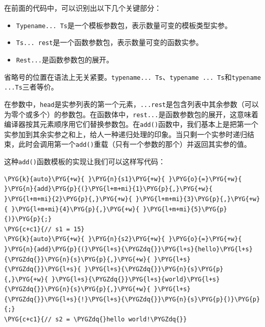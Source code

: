 
在前面的代码中，可以识别出以下几个关键部分：



\begin{itemize}
\item \texttt{Typename... Ts}是一个模板参数包，表示数量可变的模板类型实参。



\item \texttt{Ts... rest}是一个函数参数包，表示数量可变的函数实参。



\item \texttt{Rest...}是函数参数包的展开。

\end{itemize}



\begin{myNote}
省略号的位置在语法上无关紧要。\texttt{typename... Ts}、\texttt{typename ... Ts}和\texttt{typename ...\allowbreak{}Ts}三者等价。
\end{myNote}



在参数中，\texttt{head}是实参列表的第一个元素，\texttt{...\allowbreak{}rest}是包含列表中其余参数（可以为零个或多个）的参数包。在函数体中，\texttt{rest...}是函数参数包的展开，这意味着编译器按其元素顺序用它们替换参数包。在\texttt{add()}函数中，我们基本上是把第一个实参加到其余实参之和上，给人一种递归处理的印象。当只剩一个实参时递归结束，此时会调用第一个\texttt{add()}重载（只有一个参数的那个）并返回其实参的值。



这种\texttt{add()}函数模板的实现让我们可以这样写代码：



\begin{codeblockbg}
\begin{Verbatim}[commandchars=\\\{\},breaklines=true,breakanywhere=true,fontsize=\codefont,xleftmargin=17bp]
\PYG{k}{auto}\PYG{+w}{ }\PYG{n}{s1}\PYG{+w}{ }\PYG{o}{=}\PYG{+w}{ }\PYG{n}{add}\PYG{p}{(}\PYG{l+m+mi}{1}\PYG{p}{,}\PYG{+w}{ }\PYG{l+m+mi}{2}\PYG{p}{,}\PYG{+w}{ }\PYG{l+m+mi}{3}\PYG{p}{,}\PYG{+w}{ }\PYG{l+m+mi}{4}\PYG{p}{,}\PYG{+w}{ }\PYG{l+m+mi}{5}\PYG{p}{)}\PYG{p}{;}
\PYG{c+c1}{// s1 = 15}
\PYG{k}{auto}\PYG{+w}{ }\PYG{n}{s2}\PYG{+w}{ }\PYG{o}{=}\PYG{+w}{ }\PYG{n}{add}\PYG{p}{(}\PYG{l+s}{\PYGZdq{}}\PYG{l+s}{hello}\PYG{l+s}{\PYGZdq{}}\PYG{n}{s}\PYG{p}{,}\PYG{+w}{ }\PYG{l+s}{\PYGZdq{}}\PYG{l+s}{ }\PYG{l+s}{\PYGZdq{}}\PYG{n}{s}\PYG{p}{,}\PYG{+w}{ }\PYG{l+s}{\PYGZdq{}}\PYG{l+s}{world}\PYG{l+s}{\PYGZdq{}}\PYG{n}{s}\PYG{p}{,}\PYG{+w}{ }\PYG{l+s}{\PYGZdq{}}\PYG{l+s}{!}\PYG{l+s}{\PYGZdq{}}\PYG{n}{s}\PYG{p}{)}\PYG{p}{;}
\PYG{c+c1}{// s2 = \PYGZdq{}hello world!\PYGZdq{}}
\end{Verbatim}
\end{codeblockbg}


